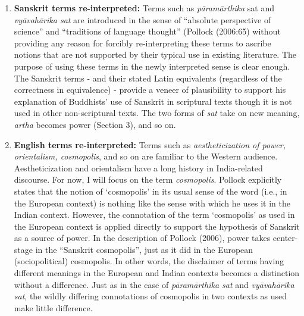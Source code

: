 \begin{enumerate}
\item {\bf Sanskrit terms re-interpreted:} Terms such as {\sl pāramārthika} sat and {\sl vyāvahārika sat} are introduced in the sense of “absolute perspective of science” and “traditions of language thought” (Pollock (2006:65) without providing any reason for forcibly re-interpreting these terms to ascribe notions that are not supported by their typical use in existing literature. The purpose of using these terms in the newly interpreted sense is clear enough. The Sanskrit terms - and their stated Latin equivalents (regardless of the correctness in equivalence) - provide a veneer of plausibility to support his explanation of Buddhists’ use of Sanskrit in scriptural texts though it is not used in other non-scriptural texts. The two forms of {\sl sat} take on new meaning, {\sl artha} becomes power (Section 3), and so on.


\item {\bf English terms re-interpreted:} Terms such as {\sl aestheticization of power, orientalism, cosmopolis}, and so on are familiar to the Western audience. Aestheticization and orientalism have a long history in India-related discourse. For now, I will focus on the term {\sl cosmopolis}. Pollock explicitly states that the notion of ‘cosmopolis’ in its usual sense of the word (i.e., in the European context) is nothing like the sense with which he uses it in the Indian context. However, the connotation of the term ‘cosmopolis’ as used in the European context is applied directly to support the hypothesis of Sanskrit as a source of power. In the description of Pollock (2006), power takes center-stage in the “Sanskrit cosmopolis”, just as it did in the European (sociopolitical) cosmopolis. In other words, the disclaimer of terms having different meanings in the European and Indian contexts becomes a distinction without a difference. Just as in the case of {\sl pāramārthika sat} and {\sl vyāvahārika sat}, the wildly differing connotations of cosmopolis in two contexts as used make little difference.
\end{enumerate}

